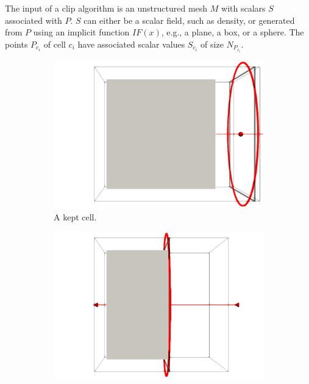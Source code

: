 \documentclass{egpubl}
\begin{document}
The input of a clip algorithm is an unstructured mesh $M$ with scalars $S$ associated with $P$. $S$ can either be a scalar field, such as density, or generated from $P$ using an implicit function $IF(x)$, e.g., a plane, a box, or a sphere. The points $P_{c_i}$ of cell $c_i$ have associated scalar values $S_{c_i}$ of size $N_{P_{c_i}}$.

\begin{figure}[h]
  \centering
  \begin{subfigure}[t]{0.29\linewidth}
    \centering
    \includegraphics[width=\linewidth]{Figures/Kept-Cell.png}
    \caption{A kept cell.}
    \label{fig:kept-cell}
  \end{subfigure}
  \begin{subfigure}[t]{0.29\linewidth}
    \centering
    \includegraphics[width=\linewidth]{Figures/Clipped-Cell.png}

\end{subfigure}
\end{figure}
\end{document}
